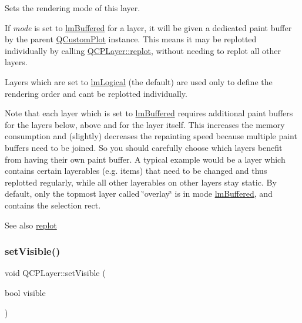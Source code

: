 Sets the rendering mode of this layer.

If {\itshape mode} is set to \hyperlink{classQCPLayer_a67dcfc1590be2a1f2227c5a39bb59c7cab581b9fab3007c4c65f057f4185d7538}{lm\+Buffered} for a layer, it will be given a dedicated paint buffer by the parent \hyperlink{classQCustomPlot}{Q\+Custom\+Plot} instance. This means it may be replotted individually by calling \hyperlink{classQCPLayer_adefd53b6db02f470151c416f42e37180}{Q\+C\+P\+Layer\+::replot}, without needing to replot all other layers.

Layers which are set to \hyperlink{classQCPLayer_a67dcfc1590be2a1f2227c5a39bb59c7ca02eb5e9a4cb7f1baf1e2b6b99e3b87ce}{lm\+Logical} (the default) are used only to define the rendering order and can\textquotesingle{}t be replotted individually.

Note that each layer which is set to \hyperlink{classQCPLayer_a67dcfc1590be2a1f2227c5a39bb59c7cab581b9fab3007c4c65f057f4185d7538}{lm\+Buffered} requires additional paint buffers for the layers below, above and for the layer itself. This increases the memory consumption and (slightly) decreases the repainting speed because multiple paint buffers need to be joined. So you should carefully choose which layers benefit from having their own paint buffer. A typical example would be a layer which contains certain layerables (e.\+g. items) that need to be changed and thus replotted regularly, while all other layerables on other layers stay static. By default, only the topmost layer called \char`\"{}overlay\char`\"{} is in mode \hyperlink{classQCPLayer_a67dcfc1590be2a1f2227c5a39bb59c7cab581b9fab3007c4c65f057f4185d7538}{lm\+Buffered}, and contains the selection rect.

\begin{DoxySeeAlso}{See also}
\hyperlink{classQCPLayer_adefd53b6db02f470151c416f42e37180}{replot} 
\end{DoxySeeAlso}
\mbox{\label{classQCPLayer_ac07671f74edf6884b51a82afb2c19516}} 
\subsubsection{\texorpdfstring{set\+Visible()}{setVisible()}}
{\footnotesize\ttfamily void Q\+C\+P\+Layer\+::set\+Visible (\begin{DoxyParamCaption}\item[{bool}]{visible }\end{DoxyParamCaption})}

